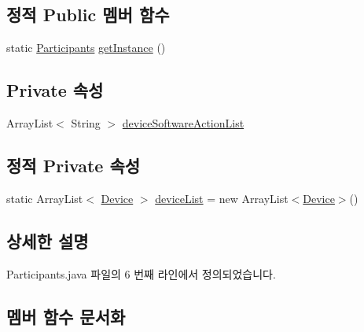 \subsection*{정적 Public 멤버 함수}
\begin{DoxyCompactItemize}
\item 
static \mbox{\hyperlink{classcom_1_1github_1_1aites_1_1framework_1_1orchestration_1_1_participants}{Participants}} \mbox{\hyperlink{classcom_1_1github_1_1aites_1_1framework_1_1orchestration_1_1_participants_ac4bbc6cb9dbf0d9637754b1276d7e8c0}{get\+Instance}} ()
\end{DoxyCompactItemize}
\subsection*{Private 속성}
\begin{DoxyCompactItemize}
\item 
Array\+List$<$ String $>$ \mbox{\hyperlink{classcom_1_1github_1_1aites_1_1framework_1_1orchestration_1_1_participants_ac53ce12002e42b5ed3b6ff38afbbaf01}{device\+Software\+Action\+List}}
\end{DoxyCompactItemize}
\subsection*{정적 Private 속성}
\begin{DoxyCompactItemize}
\item 
static Array\+List$<$ \mbox{\hyperlink{classcom_1_1github_1_1aites_1_1framework_1_1orchestration_1_1_device}{Device}} $>$ \mbox{\hyperlink{classcom_1_1github_1_1aites_1_1framework_1_1orchestration_1_1_participants_ab90ca1b5cf16aec6e3e6608df4a8d2ad}{device\+List}} = new Array\+List$<$\mbox{\hyperlink{classcom_1_1github_1_1aites_1_1framework_1_1orchestration_1_1_device}{Device}}$>$()
\end{DoxyCompactItemize}


\subsection{상세한 설명}


Participants.\+java 파일의 6 번째 라인에서 정의되었습니다.



\subsection{멤버 함수 문서화}
\mbox{\label{classcom_1_1github_1_1aites_1_1framework_1_1orchestration_1_1_participants_aa739db866e3ec3b741fc4005b620694a}} 
